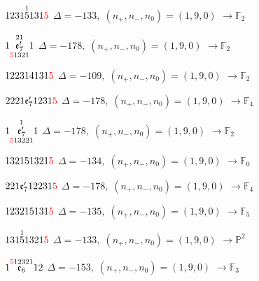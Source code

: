 \documentclass[10pt]{article}
\begin{document}
$1231\overset{1}{5}131\textcolor{red}{5}$ \quad $\Delta=-133,\; (n_+,n_-,n_0)=(1,9,0)$ \quad $\to \mathbb{F}_{2}$

\smallskip

$1\overset{21}{\underset{\textcolor{red}{5}1321}{\mathfrak{e}_7'}}1$ \quad $\Delta=-178,\; (n_+,n_-,n_0)=(1,9,0)$ \quad $\to \mathbb{F}_{2}$

\smallskip

$122314131\textcolor{red}{5}$ \quad $\Delta=-109,\; (n_+,n_-,n_0)=(1,9,0)$ \quad $\to \mathbb{F}_{2}$

\smallskip

$2221\mathfrak{e}_7'1231\textcolor{red}{5}$ \quad $\Delta=-178,\; (n_+,n_-,n_0)=(1,9,0)$ \quad $\to \mathbb{F}_{4}$

\smallskip

$1\overset{1}{\underset{\textcolor{red}{5}13221}{\mathfrak{e}_7'}}1$ \quad $\Delta=-178,\; (n_+,n_-,n_0)=(1,9,0)$ \quad $\to \mathbb{F}_{2}$

\smallskip

$132151321\textcolor{red}{5}$ \quad $\Delta=-134,\; (n_+,n_-,n_0)=(1,9,0)$ \quad $\to \mathbb{F}_{0}$

\smallskip

$221\mathfrak{e}_7'12231\textcolor{red}{5}$ \quad $\Delta=-178,\; (n_+,n_-,n_0)=(1,9,0)$ \quad $\to \mathbb{F}_{4}$

\smallskip

$123215131\textcolor{red}{5}$ \quad $\Delta=-135,\; (n_+,n_-,n_0)=(1,9,0)$ \quad $\to \mathbb{F}_{5}$

\smallskip

$131\overset{1}{5}1321\textcolor{red}{5}$ \quad $\Delta=-133,\; (n_+,n_-,n_0)=(1,9,0)$ \quad $\to \mathbb{P}^2$

\smallskip

$1\overset{\textcolor{red}{5}12321}{\mathfrak{e}_6}12$ \quad $\Delta=-153,\; (n_+,n_-,n_0)=(1,9,0)$ \quad $\to \mathbb{F}_{3}$

\smallskip
\end{document}

